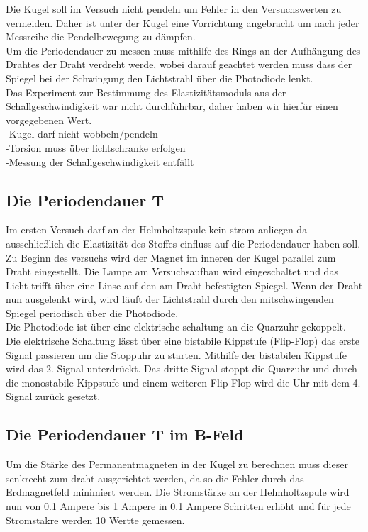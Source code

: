 Die Kugel soll im Versuch nicht pendeln um Fehler in den Versuchswerten zu vermeiden.
Daher ist unter der Kugel eine Vorrichtung angebracht um nach jeder Messreihe die Pendelbewegung zu dämpfen.\\

Um die Periodendauer zu messen muss mithilfe des Rings an der Aufhängung des Drahtes der Draht verdreht werde,
wobei darauf geachtet werden muss dass der Spiegel bei der Schwingung den Lichtstrahl über die Photodiode lenkt.\\

Das Experiment zur Bestimmung des Elastizitätsmoduls aus der Schallgeschwindigkeit war nicht durchführbar,
daher haben wir hierfür einen vorgegebenen Wert.\\

-Kugel darf nicht wobbeln/pendeln\\
-Torsion muss über lichtschranke erfolgen\\
-Messung der Schallgeschwindigkeit entfällt\\

\subsection{Die Periodendauer T}
Im ersten Versuch darf an der Helmholtzspule kein strom anliegen da ausschließlich die Elastizität des Stoffes einfluss auf die Periodendauer haben soll.
Zu Beginn des versuchs wird der Magnet im inneren der Kugel parallel zum Draht eingestellt.
Die Lampe am Versuchsaufbau wird eingeschaltet und das Licht trifft über eine Linse auf den am Draht befestigten Spiegel.
Wenn der Draht nun ausgelenkt wird, wird läuft der Lichtstrahl durch den mitschwingenden Spiegel periodisch über die Photodiode.\\
Die Photodiode ist über eine elektrische schaltung an die Quarzuhr gekoppelt.
Die elektrische Schaltung lässt über eine bistabile Kippstufe (Flip-Flop) das erste Signal passieren um die Stoppuhr zu starten.
Mithilfe der bistabilen Kippstufe wird das 2. Signal unterdrückt.
Das dritte Signal stoppt die Quarzuhr und durch die monostabile Kippstufe und einem weiteren Flip-Flop wird die Uhr mit dem 4. Signal zurück gesetzt.\\

\subsection{Die Periodendauer T im B-Feld}
Um die Stärke des Permanentmagneten in der Kugel zu berechnen muss dieser senkrecht zum draht ausgerichtet werden, da so die Fehler durch das Erdmagnetfeld minimiert werden.
Die Stromstärke an der Helmholtzspule wird nun von 0.1 Ampere bis 1 Ampere in 0.1 Ampere Schritten erhöht und für jede Stromstakre werden 10 Wertte gemessen.